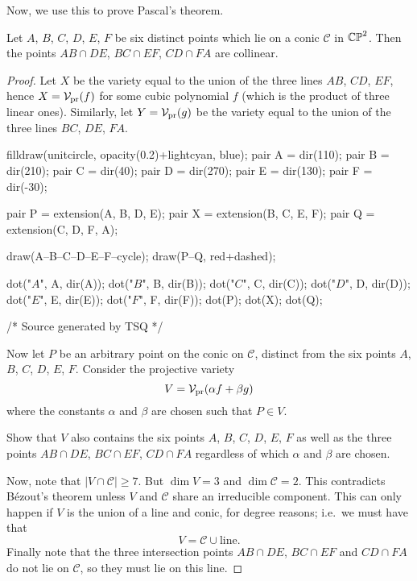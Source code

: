 Now, we use this to prove Pascal's theorem.
\begin{theorem}
	Let $A$, $B$, $C$, $D$, $E$, $F$ be six
	distinct points which lie on a conic $\mathscr C$ in $\mathbb{CP}^2$.
	Then the points $AB \cap DE$, $BC \cap EF$, $CD \cap FA$ are collinear.
\end{theorem}
\begin{proof}
	Let $X$ be the variety equal to the union of the
	three lines $AB$, $CD$, $EF$, hence $X = \mathcal V_{\text{pr}}(f)$
	for some cubic polynomial $f$ (which is the product of three linear ones).
	Similarly, let $Y = \mathcal V_{\text{pr}}(g)$ be the variety
	equal to the union of the three lines $BC$, $DE$, $FA$.

	\begin{center}
		\begin{asy}
			filldraw(unitcircle, opacity(0.2)+lightcyan, blue);
			pair A = dir(110);
			pair B = dir(210);
			pair C = dir(40);
			pair D = dir(270);
			pair E = dir(130);
			pair F = dir(-30);

			pair P = extension(A, B, D, E);
			pair X = extension(B, C, E, F);
			pair Q = extension(C, D, F, A);

			draw(A--B--C--D--E--F--cycle);
			draw(P--Q, red+dashed);

			dot("$A$", A, dir(A));
			dot("$B$", B, dir(B));
			dot("$C$", C, dir(C));
			dot("$D$", D, dir(D));
			dot("$E$", E, dir(E));
			dot("$F$", F, dir(F));
			dot(P);
			dot(X);
			dot(Q);

			/* Source generated by TSQ */
		\end{asy}
	\end{center}

	Now let $P$ be an arbitrary point on the conic on $\mathscr C$,
	distinct from the six points $A$, $B$, $C$, $D$, $E$, $F$.
	Consider the projective variety
	\[ V = \mathcal V_{\text{pr}}(\alpha f + \beta g) \]
	where the constants $\alpha$ and $\beta$ are chosen such that $P \in V$.
	\begin{ques}
		Show that $V$ also contains the six points $A$, $B$, $C$, $D$, $E$, $F$
		as well as the three points $AB \cap DE$, $BC \cap EF$, $CD \cap FA$
		regardless of which $\alpha$ and $\beta$ are chosen.
	\end{ques}

	Now, note that $|V \cap \mathscr C| \ge 7$.
	But $\dim V = 3$ and $\dim \mathscr C = 2$.
	This contradicts B\'ezout's theorem unless $V$ and $\mathscr C$
	share an irreducible component.
	This can only happen if $V$ is the union of a line and conic,
	for degree reasons; i.e.\ we must have that
	\[ V = \mathscr C \cup \text{line}. \]
	Finally note that the three intersection points $AB \cap DE$,
	$BC \cap EF$ and $CD \cap FA$ do not lie on $\mathscr C$,
	so they must lie on this line.
\end{proof}


